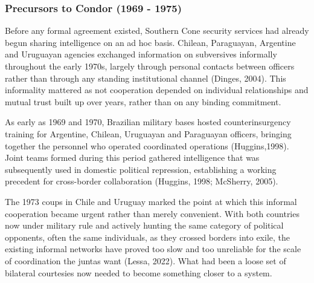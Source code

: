 \subsubsection{Precursors to Condor (1969 - 1975)}

Before any formal agreement existed, Southern Cone security services had already begun sharing intelligence on an ad hoc basis. Chilean, Paraguayan, Argentine and Uruguayan agencies exchanged information on subversives informally throughout the early 1970s, largely through personal contacts between officers rather than through any standing institutional channel (Dinges, 2004). This informality mattered as not cooperation depended on individual relationships and mutual trust built up over years, rather than on any binding commitment.

As early as 1969 and 1970, Brazilian military bases hosted counterinsurgency training for Argentine, Chilean, Uruguayan and Paraguayan officers, bringing together the personnel who operated coordinated operations (Huggins,1998). Joint teams formed during this period gathered intelligence that was subsequently used in domestic political repression, establishing a working precedent for cross-border collaboration (Huggins, 1998; McSherry, 2005).

The 1973 coups in Chile and Uruguay marked the point at which this informal cooperation became urgent rather than merely convenient. With both countries now under military rule and actively hunting the same category of political opponents, often the same individuals, as they crossed borders into exile, the existing informal networks have proved too slow and too unreliable for the scale of coordination the juntas want (Lessa, 2022). What had been a loose set of bilateral courtesies now needed to become something closer to a system.

